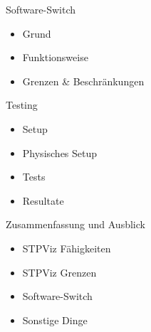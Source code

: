 \documentclass{beamer}
\begin{document}
\begin{frame}{Software-Switch}
    \begin{itemize}
        \item Grund
        \item Funktionsweise
        \item Grenzen \& Beschränkungen
    \end{itemize}
\end{frame}

\begin{frame}{Testing}
    \begin{itemize}
        \item Setup
        \item Physisches Setup
        \item Tests
        \item Resultate
    \end{itemize}
\end{frame}

\begin{frame}{Zusammenfassung und Ausblick}
    \begin{itemize}
        \item STPViz Fähigkeiten
        \item STPViz Grenzen
        \item Software-Switch
        \item Sonstige Dinge
    \end{itemize}
\end{frame}
\end{document}
